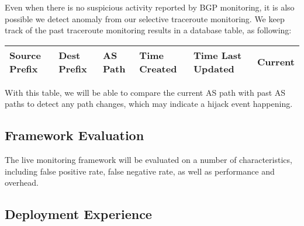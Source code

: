 \begin{itemize}
Even when there is no suspicious activity reported by BGP monitoring, it is also possible we detect anomaly from our selective traceroute monitoring. We keep track of the past traceroute monitoring results in a database table, as following:
\begin{center}
\begin{tabular}{ p{8mm} | p{8mm} | p{6mm} | p{1cm} | p{1.1cm} | p{8mm}}
  \hline			
  Source Prefix & Dest Prefix & AS Path & Time Created & Time Last Updated & Current \\
  \hline  
\end{tabular}
\label{tab:pathinfo}
\end{center}
With this table, we will be able to compare the current AS path with past AS paths to detect any path changes, which may indicate a hijack event happening. 

\end{itemize}


\subsection{Framework Evaluation}
The live monitoring framework will be evaluated on a number of characteristics, including false positive rate, false negative rate, as well as performance and overhead.

\subsection{Deployment Experience}
